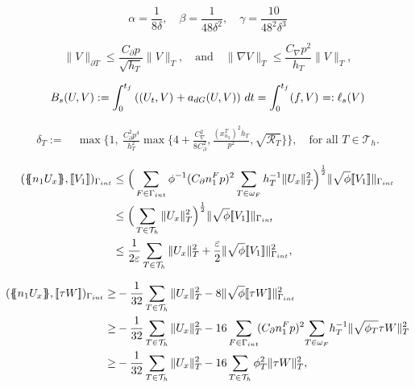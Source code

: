 \documentclass[10pt,a4paper]{amsart}
\newcommand{\Th}{\mathcal{T}_h}
\newcommand{\av}[1]{\{\kern-1.2mm \{{#1}\}\kern-1.2mm\}}
\newcommand{\avg }[1]{ \av{ #1}}
\newcommand{\cinv}{C_{\nabla}}
\newcommand{\cinvT}{C_{\partial}}
\newcommand{\dt}{\,{\rm dt}}
\newcommand{\gint}{\Gamma_{\rm int}}
\newcommand{\inner}[3]{({#1},{#2})_{{#3}}}
\newcommand{\jump}[1]{[\kern-0.6mm [{#1}]\kern-0.6mm]}
\newcommand{\norm}[2]{\|{#1}\|_{{#2}}}
\newcommand{\normal}{{n}}
\newcommand{\su}{\sum_{T \in \Th}}
\newcommand{\tf}{{t_{\rm f}}}
\newcommand{\utr}{W}
\newcommand{\xn}{x_{n_2}^{T}}
\begin{document}
\begin{equation}\label{eq:alpha_beta_gamma_def}
    \alpha =
    \frac{1}{8\delta},
    \quad
    \beta =
    \frac{1}{48 \delta^2},
    \quad
    \gamma =
    \frac{10}{48^2 \delta ^3}
\end{equation}

\begin{equation}\label{trace_H1_inv}
\|V\|_{\partial T} \leq \frac{\cinvT p}{ \sqrt{h_T}}  \|V\|_{ T},
 \quad\text{and}\quad
\|\nabla V\|_{T} \leq  \frac{\cinv p^2}{h_T}  \|V\|_{ T},
\end{equation}

\begin{equation}\label{def: seim-discrete bilinear form}
    B_{\rm s}(U,V)
    :=
    \int_0^{\tf}  \left(\inner{U_t}{V}{} +  a_{\rm dG}(U,V) \right) \dt
    =
    \int_0^\tf
    \inner{f}{V}{}=:   \ell_{\rm s}(V)
    \end{equation}

\begin{equation}\label{def:delta_def}\begin{split} \delta_T:=&\ \max\bigg\{1,\  \frac{\cinvT^2p^4}{h_T^2}\max\Big\{4+\frac{\cinv^2}{8
    	\cinvT^2},\frac{(\xn)^2h_T}{p^2},\sqrt{\mathcal{R}_T}\Big\}\bigg\}, \quad \text{for all $T\in \Th$}.
    \end{split}
\end{equation}

\begin{equation}\label{eq:standard_flux_estimate}
\begin{aligned}
 \inner{\avg{\normal_1 U_x}}{\jump{V_1}}{\gint }
 &\leq  \Big(\sum_{F\in \gint } \phi^{-1}(\cinvT n_1^Fp)^2 \sum_{T\in\omega_F}   h_T^{-1} \norm{  U_x}{ T}^2\Big)^{\frac{1}{2}} \norm{\sqrt{\phi} \jump{V_1}}{\gint} \\
 &\leq  \Big(\su  \norm{  U_x}{ T}^2 \Big)^{\frac{1}{2}} \norm{\sqrt{\phi} \jump{V_1}}{\gint} \\
&\leq \frac{1}{2\varepsilon}  \su \norm{ U_x}{ T}^2 +  \frac{\varepsilon}{2}\norm{\sqrt{\phi} \jump{V_1}}{\gint}^2,
\end{aligned}
\end{equation}

\begin{equation}\begin{split}\label{eq:double_inv_flux_estimate}
		\inner{\avg{\normal_1 U_x}}{\jump{\tau\utr}}{\gint}
		\ge&
		-
		\frac{1}{32}\su \norm{U_x}{T}^2 -8 \norm{\sqrt{\phi}\jump{\tau\utr}}{\gint}^2\\
		\ge &	-
		\frac{1}{32}\su \norm{U_x}{T}^2-16\sum_{F\in \gint }\! (\cinvT n_1^Fp)^2 \!\sum_{T\in\omega_F}  \! h_T^{-1} \norm{ \sqrt{\phi_T} \tau \utr}{ T}^2\\
			\ge &	-
		\frac{1}{32}\su \norm{U_x}{T}^2-16\su \phi_T^2\norm{  \tau \utr}{ T}^2,
\end{split}\end{equation}
\end{document}
